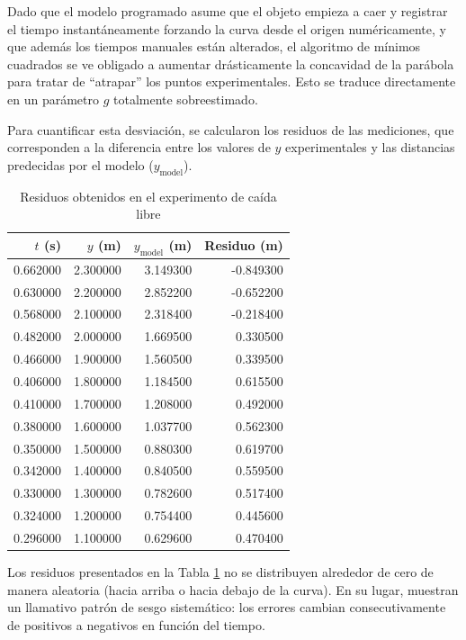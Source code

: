 \documentclass[12pt,a4paper]{article}
\begin{document}
Dado que el modelo programado asume que el objeto empieza a caer y registrar el tiempo instantáneamente forzando la curva desde el origen numéricamente, y que además los tiempos manuales están alterados, el algoritmo de mínimos cuadrados se ve obligado a aumentar drásticamente la concavidad de la parábola para tratar de ``atrapar'' los puntos experimentales. Esto se traduce directamente en un parámetro $g$ totalmente sobreestimado.

Para cuantificar esta desviación, se calcularon los residuos de las mediciones, que corresponden a la diferencia entre los valores de $y$ experimentales y las distancias predecidas por el modelo ($y_{\text{model}}$).

\begin{table}[H]
\centering
\caption{Residuos obtenidos en el experimento de caída libre}
\label{tab:residuos_caida}
\begin{tabular}{rrrr}
\toprule
$t$ (s) & $y$ (m) & $y_{\text{model}}$ (m) & Residuo (m) \\
\midrule
0.662000 & 2.300000 & 3.149300 & -0.849300 \\
0.630000 & 2.200000 & 2.852200 & -0.652200 \\
0.568000 & 2.100000 & 2.318400 & -0.218400 \\
0.482000 & 2.000000 & 1.669500 & 0.330500 \\
0.466000 & 1.900000 & 1.560500 & 0.339500 \\
0.406000 & 1.800000 & 1.184500 & 0.615500 \\
0.410000 & 1.700000 & 1.208000 & 0.492000 \\
0.380000 & 1.600000 & 1.037700 & 0.562300 \\
0.350000 & 1.500000 & 0.880300 & 0.619700 \\
0.342000 & 1.400000 & 0.840500 & 0.559500 \\
0.330000 & 1.300000 & 0.782600 & 0.517400 \\
0.324000 & 1.200000 & 0.754400 & 0.445600 \\
0.296000 & 1.100000 & 0.629600 & 0.470400 \\
\bottomrule
\end{tabular}
\end{table}

Los residuos presentados en la Tabla \ref{tab:residuos_caida} no se distribuyen alrededor de cero de manera aleatoria (hacia arriba o hacia debajo de la curva). En su lugar, muestran un llamativo patrón de sesgo sistemático: los errores cambian consecutivamente de positivos a negativos en función del tiempo. 
\end{document}
